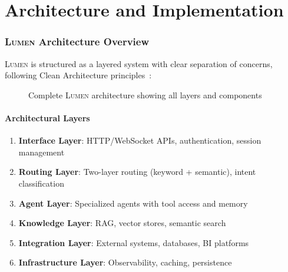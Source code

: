 \documentclass[11pt,a4paper]{article}
\theoremstyle{definition}
\theoremstyle{remark}
\newcommand{\lumen}{\textsc{Lumen}\xspace}
\begin{document}

\part{Architecture and Implementation}


\section{\lumen Architecture Overview}
\label{sec:architecture}

\lumen is structured as a layered system with clear separation of concerns, following Clean Architecture principles~\cite{martin2017clean,fowler2002patterns}:

\begin{figure}[H]
    \centering
    
    \caption{Complete \lumen architecture showing all layers and components}
    \label{fig:lumen-architecture}
\end{figure}

\subsection{Architectural Layers}

\begin{enumerate}
    \item \textbf{Interface Layer}: HTTP/WebSocket APIs, authentication, session management
    \item \textbf{Routing Layer}: Two-layer routing (keyword + semantic), intent classification
    \item \textbf{Agent Layer}: Specialized agents with tool access and memory
    \item \textbf{Knowledge Layer}: RAG, vector stores, semantic search
    \item \textbf{Integration Layer}: External systems, databases, BI platforms
    \item \textbf{Infrastructure Layer}: Observability, caching, persistence
\end{enumerate}
\end{document}
